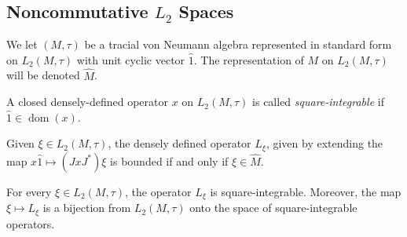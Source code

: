 \documentclass[10pt]{mypackage}
\begin{document}
\subsection{Noncommutative $L_2$ Spaces}%
We let $\left( M,\tau \right)$ be a tracial von Neumann algebra represented in standard form on $L_2\left( M,\tau \right)$ with unit cyclic vector $\hat{1}$. The representation of $M$ on $L_2\left( M,\tau \right)$ will be denoted $ \widehat{M} $.
\begin{definition}
  A closed densely-defined operator $x$ on $L_2\left( M,\tau \right)$ is called \textit{square-integrable} if $\hat{1}\in \operatorname{dom}\left( x \right)$.
\end{definition}
Given $\xi\in L_2\left( M,\tau \right)$, the densely defined operator $L_{\xi}$, given by extending the map $x\hat{1}\mapsto \left( JxJ^{\ast} \right)\xi$ is bounded if and only if $\xi\in\widehat{M}$.
\begin{theorem}
  For every $\xi\in L_2\left( M,\tau \right)$, the operator $L_{\xi}$ is square-integrable. Moreover, the map $\xi\mapsto L_{\xi}$ is a bijection from $L_2\left( M,\tau \right)$ onto the space of square-integrable operators.
\end{theorem}
\end{document}

